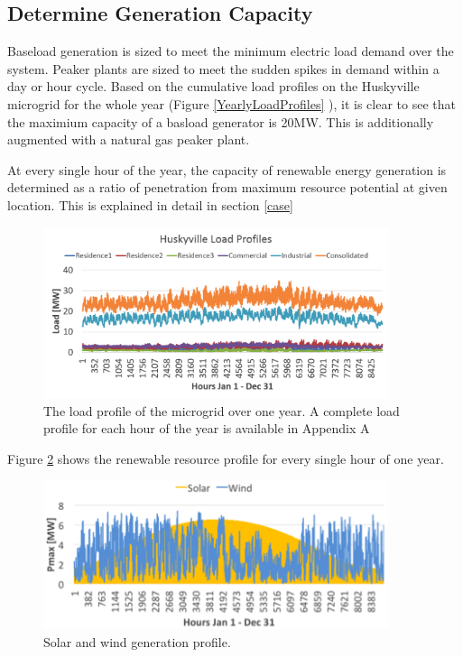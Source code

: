 \documentclass[a4paper]{article}
\begin{document}
\subsection{Determine Generation Capacity}

Baseload generation is sized to meet the minimum electric load demand over the system. Peaker plants are sized to meet the sudden spikes in demand within a day or hour cycle. Based on the cumulative load profiles on the Huskyville microgrid for the whole year (Figure \ref{YearlyLoadProfiles} ), it is clear to see that the maximium capacity of a basload generator is 20MW. This is additionally augmented with a natural gas peaker plant. 

At every single hour of the year, the capacity of renewable energy generation is determined as a ratio of penetration from maximum resource potential at given location. This is explained in detail in section \ref{case}

\begin{figure}[h!]
\centering
\includegraphics[width=0.9\textwidth]{YearlyLoadProfile.png}
\caption{\label{fig:YearlyLoadProfiles} The load profile of the microgrid over one year. A complete load profile for each hour of the year is available in Appendix A}
\end{figure}

Figure \ref{fig:FIG3} shows the renewable resource profile for every single hour of one year.  

\begin{figure}[h!]
\centering
\includegraphics[width=0.9\textwidth]{FIG3.png}
\caption{\label{fig:FIG3}Solar and wind generation profile.}
\end{figure}
\end{document}
